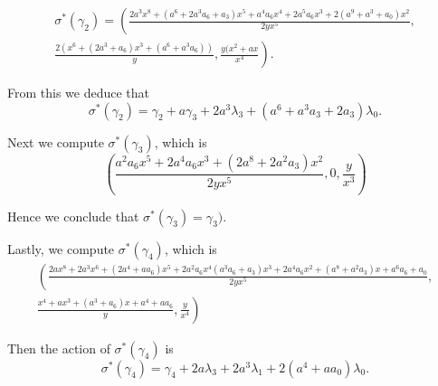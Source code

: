 \documentclass[draft, 11pt]{article} %
\theoremstyle{plain}
\theoremstyle{remark}
\begin{document}
\begin{multline}
\sigma^*(\gamma_2) = \left( \frac{2a^3x^8 + (a^6 + 2a^3a_6 + a_3)x^5 + a^4a_6x^4 + 2a^5a_6x^3 + 2(a^9 + a^3+a_0)x^2}{2yx^5} \right., \\
\left. \frac{2(x^6 + (2a^3+a_6)x^3 + (a^6 + a^3a_6))}{y} , \frac{y(x^2 + ax}{x^4} \right).
\end{multline}
 

From this we deduce that
\[
\sigma^*(\gamma_2) = \gamma_2 + a \gamma_3 + 2a^3 \lambda_3 + (a^6 + a^3a_3 + 2a_3)\lambda_0.
\]





Next we compute $\sigma^*(\gamma_3)$, which is
\begin{equation*}
\left( \frac{a^2a_6x^5 + 2a^4a_6x^3 + (2a^8 + 2a^2a_3)x^2}{2yx^5}, 0, \frac{y}{x^3} \right)
\end{equation*}


Hence we conclude that $\sigma^*(\gamma_3) = \gamma_3)$.

Lastly, we compute $\sigma^*(\gamma_4)$, which is
\begin{multline*}
\left( \frac{2ax^8 + 2a^3x^6 + (2a^4 +aa_6)x^5 + 2a^2a_6x^4 (a^3a_6 + a_3)x^3 + 2a^4a_6x^2 + (a^8 + a^2a_3)x + a^6a_6 +a_0 }{2yx^5},\right. \\ \left. \frac{x^4 +ax^3 +(a^3+a_6)x + a^4+aa_6}{y}, \frac{y}{x^4} \right)
\end{multline*}

Then the action of $\sigma^*(\gamma_4)$ is 
\[
\sigma^*(\gamma_4) = \gamma_4 + 2a\lambda_3 + 2a^3\lambda_1 + 2(a^4 + aa_0)\lambda_0.
\]









\end{document}
